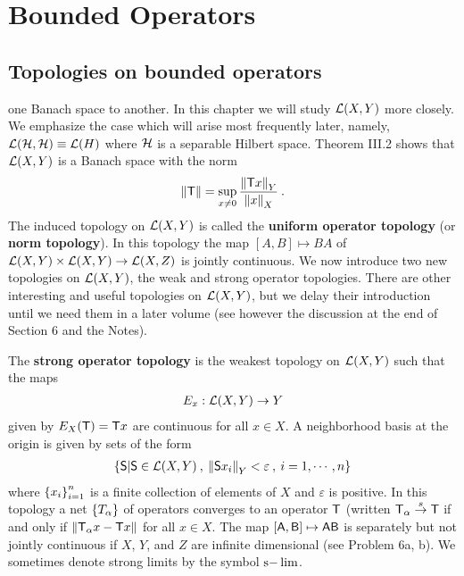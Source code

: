 
\setcounter{section}{5}
\section{Bounded Operators}

\subsection{Topologies on bounded operators}

one Banach space to another. In this chapter we will study $\mathcal L(X,Y)$ more
closely. We emphasize the case which will arise most frequently later, namely,
$\mathcal L(\mathcal{H}, \mathcal{H}) \equiv \mathcal L(H)$ where $\mathcal{H}$ is a separable Hilbert space. Theorem III.2
shows that $\mathcal L(X,Y)$ is a Banach space with the norm \begin{align}
    \left \Vert \mathsf{T} \right \Vert = \sup_{x \neq 0} \frac{\left \Vert \mathsf{T} x \right \Vert_Y}{\left \Vert x \right \Vert_X} \:.
\end{align}
The induced topology on $\mathcal L(X,Y)$ is called the \textbf{uniform operator topology} (or \textbf{norm topology}). In this topology the map $[A,B] \mapsto BA$ of $\mathcal L(X,Y) \times \mathcal L(X,Y) \to \mathcal L(X,Z)$ is jointly continuous.
We now introduce two new topologies on $\mathcal L(X,Y)$, the weak and strong operator topologies. There are other interesting and useful topologies on $\mathcal L(X,Y)$, but we delay their introduction until we need them in a later volume (see however the discussion at the end of Section 6 and the Notes).

The \textbf{strong operator topology} is the weakest topology on $\mathcal L(X,Y)$ such that the maps \begin{align}
    E_x : \mathcal L(X,Y) \to Y 
\end{align}
given by $E_X(\mathsf{T}) = \mathsf{T} x$ are continuous for all $x \in X$. A neighborhood basis at the origin is given by sets of the form \begin{align}
    \left \lbrace \mathsf{S} | \mathsf{S} \in \mathcal L(X,Y) \:, \: \left \Vert \mathsf{S} x_i \right \Vert_Y < \varepsilon \:, \: i = 1, \cdots, n \right \rbrace
\end{align}
where $\left \lbrace x_i \right \rbrace_{i=1}^n$ is a finite collection of elements of $X$ and $\varepsilon$ is positive. In this topology a net $\left \lbrace T_\alpha \right \rbrace$ of operators converges to an operator $\mathsf{T}$ (written $\mathsf{T}_\alpha \overset{s}\rightarrow \mathsf{T}$ if and only if $\left \Vert \mathsf{T}_\alpha x - \mathsf{T} x \right \Vert$ for all $x \in X$. The map $[\mathsf{A}, \mathsf{B}] \mapsto \mathsf{A} \mathsf{B}$ is separately but not jointly continuous if $X$, $Y$, and $Z$ are infinite dimensional (see Problem 6a, b). We sometimes denote strong limits by the symbol $\mathrm{s-}\lim$.


